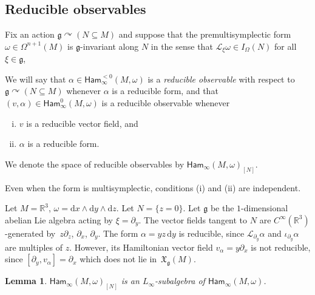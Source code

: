 \documentclass[10pt,a4paper]{amsart}
\numberwithin{equation}{section}
\newtheorem{Lemma}[Theorem]{Lemma}
\newcommand{\g}{\mathfrak{g}}
\newcommand{\Ham}{\mathsf{Ham}}
\newcommand{\fgmodule}{\mathfrak{X}_{\g}}
\renewcommand{\L}{\mathscr{L}}
\renewcommand{\subset}{\subseteq}
\renewcommand{\d}{\mathrm{d}}
\begin{document}
\subsection{Reducible observables}%

Fix an action $\g\curvearrowright(N\subset M)$ and suppose that the premultisymplectic form $\omega\in\Omega^{n+1}(M)$ is $\g$-invariant along $N$ in the sense that $\L_\xi\omega\in I_\Omega(N)$ for all $\xi\in\g$,

\begin{Definition}\label{def:reducibleObservables}
	We will say that $\alpha\in \Ham_\infty^{<0}(M,\omega)$ is a \emph{reducible observable} with respect to $\g\curvearrowright(N\subset M)$ whenever $\alpha$ is a reducible form, and that $(v,\alpha)\in\Ham_\infty^0(M,\omega)$ is a reducible observable whenever
	\begin{enumerate}[i.]\itemsep=0pt
		\item[(i)] $v$ is a reducible vector field, and
		\item[(ii)] $\alpha$ is a reducible form.
	\end{enumerate}
	We denote the space of reducible observables by $\Ham_\infty(M,\omega)_{[N]}$.
\end{Definition}

Even when the form is multisymplectic, conditions (i) and (ii) are independent.

\begin{Example}
	Let $M=\mathbb R^3$, $\omega=\d x\wedge \d y\wedge \d z$. Let $N=\{z=0\}$. Let $\mathfrak g$ be the $1$-dimensional abelian Lie algebra acting by $\xi=\partial_y$. The vector fields tangent to $N$ are $C^\infty(\mathbb R^3)$-generated by~$z\partial_z$, $\partial_x$, $\partial_y$.
	The form $\alpha=yz\,\d y$ is reducible, since $\L_{\partial_y}\alpha$ and $\iota_{\partial_y}\alpha$ are multiples of $z$. However, its Hamiltonian vector field $v_\alpha=y\partial_x$ is not reducible, since $[\partial_y,v_\alpha]=\partial_x$ which does not lie in~$\fgmodule(M)$.
\end{Example}

\begin{Lemma}%
	$\Ham_\infty(M,\omega)_{[N]}$ is an $L_\infty$-subalgebra of $\Ham_\infty(M,\omega)$.
\end{Lemma}
\end{document}
